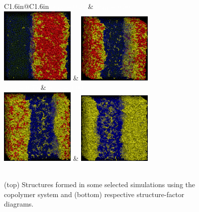 \documentclass[
aip,
jcp,
reprint,
]{revtex4-1}
\begin{document}
\begin{figure}
	\centering
	\begin{tabular}{C{1.6in}@{}C{1.6in}}
		 \textcolor{white}{$w_{AB}=0.25$} & \textcolor{white}{$w_{AB}=0.50$} \\
		 \includegraphics[width=1.4in]{A1B9_A9B1_025} & \includegraphics[width=1.4in]{A1B9_A9B1_050} \\
		 \textcolor{white}{$w_{AB}=0.75$} & \textcolor{white}{ $w_{AB}=1.00$} \\
		 \includegraphics[width=1.4in]{A1B9_A9B1_075} & \includegraphics[width=1.4in]{A1B9_A9B1_100} \\
		 \\
	\end{tabular}
	\caption{(top) Structures formed in some selected simulations using the  copolymer system and (bottom) respective structure-factor diagrams.}
	\label{fig:Figure_12}
\end{figure}
\end{document}
